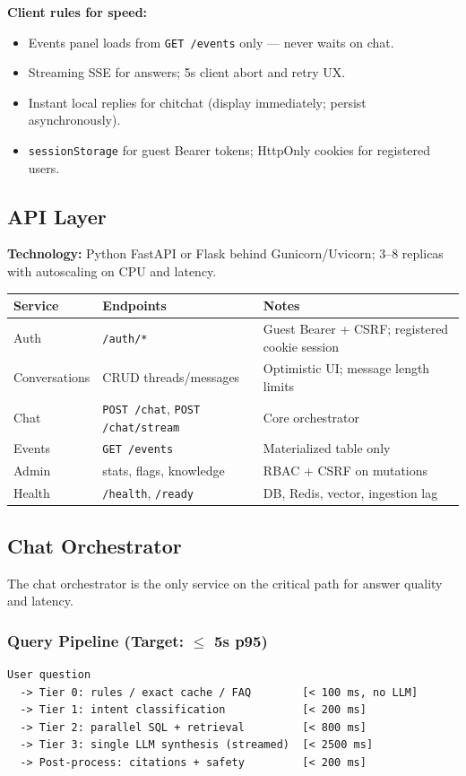 \documentclass[11pt,a4paper]{article}
\begin{document}
\textbf{Client rules for speed:}
\begin{itemize}[noitemsep]
  \item Events panel loads from \texttt{GET /events} only --- never waits on chat.
  \item Streaming SSE for answers; 5s client abort and retry UX.
  \item Instant local replies for chitchat (display immediately; persist asynchronously).
  \item \texttt{sessionStorage} for guest Bearer tokens; HttpOnly cookies for registered users.
\end{itemize}

\subsection{API Layer}
\textbf{Technology:} Python FastAPI or Flask behind Gunicorn/Uvicorn; 3--8 replicas with autoscaling on CPU and latency.

\begin{table}[h]
\centering
\small
\begin{tabular}{@{}llp{6.5cm}@{}}
\toprule
\textbf{Service} & \textbf{Endpoints} & \textbf{Notes} \\
\midrule
Auth & \texttt{/auth/*} & Guest Bearer + CSRF; registered cookie session \\
Conversations & CRUD threads/messages & Optimistic UI; message length limits \\
Chat & \texttt{POST /chat}, \texttt{POST /chat/stream} & Core orchestrator \\
Events & \texttt{GET /events} & Materialized table only \\
Admin & stats, flags, knowledge & RBAC + CSRF on mutations \\
Health & \texttt{/health}, \texttt{/ready} & DB, Redis, vector, ingestion lag \\
\bottomrule
\end{tabular}
\end{table}

\subsection{Chat Orchestrator}
The chat orchestrator is the only service on the critical path for answer quality and latency.

\subsubsection{Query Pipeline (Target: $\leq$ 5s p95)}
\begin{verbatim}
User question
  -> Tier 0: rules / exact cache / FAQ        [< 100 ms, no LLM]
  -> Tier 1: intent classification            [< 200 ms]
  -> Tier 2: parallel SQL + retrieval         [< 800 ms]
  -> Tier 3: single LLM synthesis (streamed)  [< 2500 ms]
  -> Post-process: citations + safety         [< 200 ms]
\end{verbatim}
\end{document}
